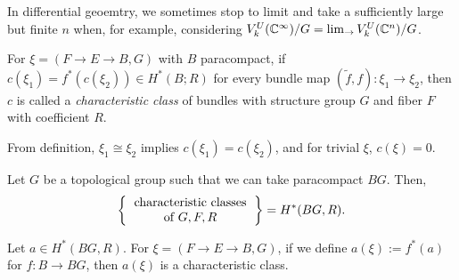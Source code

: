 \documentclass{../../small}
\begin{document}
In differential geoemtry, we sometimes stop to limit and take a sufficiently large but finite $n$ when, for example, considering $V_k^U(\mathbb{C}^\infty)/G=\lim_\to V_k^U(\mathbb{C}^n)/G$.


\begin{defn*}[3.11]
For $\xi=(F\to E\to B,G)$ with $B$ paracompact,
if $c(\xi_1)=f^*(c(\xi_2))\in H^*(B;R)$ for every bundle map $(\tilde f,f):\xi_1\to\xi_2$, then $c$ is called a \emph{characteristic class} of bundles with structure group $G$ and fiber $F$ with coefficient $R$.
\end{defn*}
From definition, $\xi_1\cong\xi_2$ implies $c(\xi_1)=c(\xi_2)$, and for trivial $\xi$, $c(\xi)=0$.

\begin{prop*}[3.12]
Let $G$ be a topological group such that we can take paracompact $BG$.
Then,
\[\left\{\begin{tabular}{c}
characteristic classes\\
of $G,F,R$
\end{tabular}\right\}=H^*(BG,R).\]
\end{prop*}
Let $a\in H^*(BG,R)$.
For $\xi=(F\to E\to B,G)$, if we define $a(\xi):=f^*(a)$ for $f:B\to BG$, then $a(\xi)$ is a characteristic class.
\end{document}
